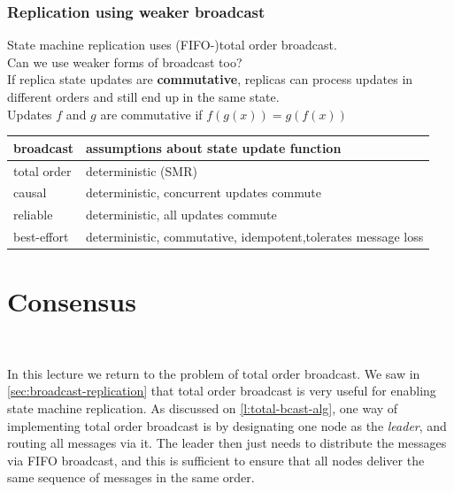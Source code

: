 \begin{frame}
    \label{s:causal-replication}
    \frametitle{Replication using weaker broadcast}
    State machine replication uses (FIFO-)total order broadcast.\\
    Can we use weaker forms of broadcast too?\\[1em]\pause
    If replica state updates are \textbf{commutative}, replicas can process updates in different orders and still end up in the same state.\\[1em]
    Updates $f$ and $g$ are commutative if $f(g(x)) = g(f(x))$\\\pause
    \renewcommand{\arraystretch}{1.3}
    \begin{tabular}{l|p{8cm}}
        \hline
        \textbf{broadcast} & \textbf{assumptions about state update function} \\\hline
        total order & deterministic (SMR) \pause\\
        causal & deterministic, concurrent updates commute \pause\\
        reliable & deterministic, all updates commute \pause\\
        best-effort & deterministic, commutative, idempotent,\newline tolerates message loss \\\hline
    \end{tabular}
\end{frame}
\label{l:causal-replication}

\section{Consensus}\label{sec:consensus}

\begin{frame}
    \begin{center}
        {\Large{\color{tumblue}{Consensus}}} \\[2em]
        \mydetails
    \end{center}
\end{frame}

In this lecture we return to the problem of total order broadcast.
We saw in \autoref{sec:broadcast-replication} that total order broadcast is very useful for enabling state machine replication.
As discussed on \autoref{l:total-bcast-alg}, one way of implementing total order broadcast is by designating one node as the \emph{leader}, and routing all messages via it.
The leader then just needs to distribute the messages via FIFO broadcast, and this is sufficient to ensure that all nodes deliver the same sequence of messages in the same order.

